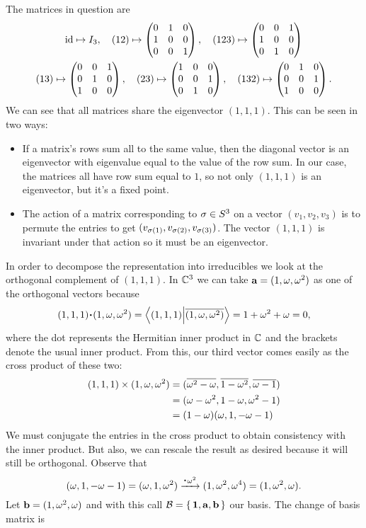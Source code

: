\documentclass[12pt]{memoir}
\begin{document}
\begin{ptcbr}
    The matrices in question are 
    \begin{gather*}
        \operatorname{id}\mapsto I_3,\quad (12)\mapsto\begin{pmatrix} 0 & 1 & 0 \\ 1 & 0 & 0 \\ 0 & 0 & 1 \end{pmatrix},\quad (123)\mapsto\begin{pmatrix} 0 & 0 & 1 \\ 1 & 0 & 0 \\ 0 & 1 & 0 \end{pmatrix}\\
        (13)\mapsto\begin{pmatrix} 0 & 0 & 1 \\ 0 & 1 & 0 \\ 1 & 0 & 0 \end{pmatrix},\quad (23)\mapsto\begin{pmatrix} 1 & 0 & 0 \\ 0 & 0 & 1 \\ 0 & 1 & 0 \end{pmatrix},\quad(132)\mapsto\begin{pmatrix} 0 & 1 & 0 \\ 0 & 0 & 1 \\ 1 & 0 & 0 \end{pmatrix}.
    \end{gather*}
    We can see that all matrices share the eigenvector $(1,1,1)$. This can be seen in two ways:
    \begin{itemize}
        \item If a matrix's rows sum all to the same value, then the diagonal vector is an eigenvector with eigenvalue equal to the value of the row sum. In our case, the matrices all have row sum equal to $1$, so not only $(1,1,1)$ is an eigenvector, but it's a fixed point.
        \item The action of a matrix corresponding to $\sigma\in S^3$ on a vector $(v_1,v_2,v_3)$ is to permute the entries to get $(v_{\sigma(1)},v_{\sigma(2)},v_{\sigma(3)})$. The vector $(1,1,1)$ is invariant under that action so it must be an eigenvector.
    \end{itemize}
    \tcblower
    In order to decompose the representation into irreducibles we look at the orthogonal complement of $(1,1,1)$. In $\mathbb{C}^3$ we can take $\mathbf{a}=(1,\omega,\omega^2)$ as one of the orthogonal vectors because 
    $$(1,1,1)\.(1,\om,\om^2)=\braket{(1,1,1)}{\ov{(1,\om,\om^2)}}=1+\om^2+\om=0,$$
    where the dot represents the Hermitian inner product in $\mathbb{C}$ and the brackets denote the usual inner product. From this, our third vector comes easily as the cross product of these two:
    \begin{align*}
    (1,1,1)\times(1,\omega,\omega^2)&=(\overline{\omega^2-\omega},\overline{1-\omega^2},\overline{\omega-1})\\
    &=(\omega-\omega^2,1-\omega,\omega^2-1)\\
    &=(1-\omega)(\omega,1,-\omega-1)
    \end{align*}
    We must conjugate the entries in the cross product to obtain consistency with the inner product. But also, we can rescale the result as desired because it will still be orthogonal. Observe that
    $$(\om,1,-\om-1)=(\om,1,\om^2)\xrightarrow[]{\.\om^2}(1,\om^2,\om^4)=(1,\om^2,\om).$$
    Let $\mathbf{b}=(1,\omega^2,\omega)$ and with this call $\mathcal{B}=\{\,\mathbf{1},\mathbf{a},\mathbf{b}\,\}$ our basis. The change of basis matrix is 

\end{ptcbr}
\end{document}
